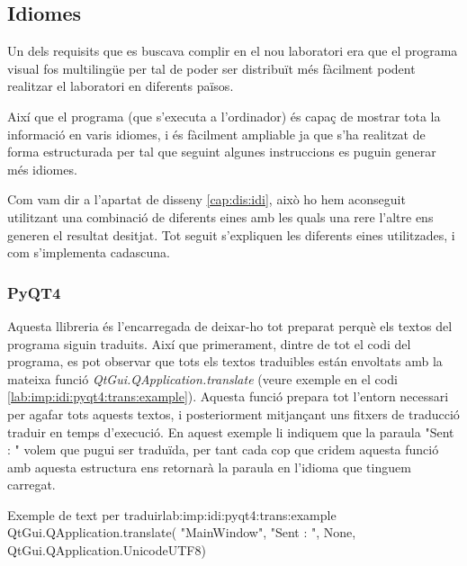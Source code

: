 \subsection{Idiomes}\label{cap:imp:idi}

Un dels requisits que es buscava complir en el nou laboratori era que el programa visual fos multilingüe per tal de poder ser distribuït més fàcilment podent realitzar el laboratori en diferents països.

Així que el programa \DCSMonitor (que s'executa a l'ordinador) és capaç de mostrar tota la informació en varis idiomes, i és fàcilment ampliable ja que s'ha realitzat de forma estructurada per tal que seguint algunes instruccions es puguin generar més idiomes.

Com vam dir a l'apartat de disseny \ref{cap:dis:idi}, això ho hem aconseguit utilitzant una combinació de diferents eines amb les quals una rere l'altre ens generen el resultat desitjat. Tot seguit s'expliquen les diferents eines utilitzades, i com s'implementa cadascuna.

\subsubsection{PyQT4}\label{cap:imp:idi:pyqt4}

Aquesta llibreria és l'encarregada de deixar-ho tot preparat perquè els textos del programa siguin traduits. Així que primerament, dintre de tot el codi del programa, es pot observar que tots els textos traduibles están envoltats amb la mateixa funció \emph{QtGui.QApplication.translate} (veure exemple en el codi \ref{lab:imp:idi:pyqt4:trans:example}).
Aquesta funció prepara tot l'entorn necessari per agafar tots aquests textos, i posteriorment mitjançant uns fitxers de traducció traduir en temps d'execució.
En aquest exemple li indiquem que la paraula "Sent : " volem que pugui ser traduïda, per tant cada cop que cridem aquesta funció amb aquesta estructura ens retornarà la paraula en l'idioma que tinguem carregat.

\begin{code_python}{Exemple de text per traduir}{lab:imp:idi:pyqt4:trans:example}
QtGui.QApplication.translate(
    "MainWindow", 
    "Sent : ", 
    None, 
    QtGui.QApplication.UnicodeUTF8)
\end{code_python}

